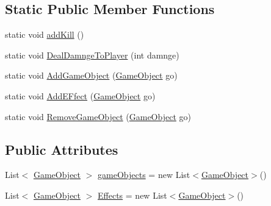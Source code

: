 \subsection*{Static Public Member Functions}
\begin{DoxyCompactItemize}
\item 
static void \mbox{\hyperlink{class_game2_1_1_game_world_acde506006de6e0361c5175597cb07df2}{add\+Kill}} ()
\item 
static void \mbox{\hyperlink{class_game2_1_1_game_world_a5ab430402255839068ec6c074a827f10}{Deal\+Damnge\+To\+Player}} (int damnge)
\item 
static void \mbox{\hyperlink{class_game2_1_1_game_world_a39e2b721c387b979bf3b71cae226607d}{Add\+Game\+Object}} (\mbox{\hyperlink{class_game2_1_1_game_object}{Game\+Object}} go)
\item 
static void \mbox{\hyperlink{class_game2_1_1_game_world_a65a39808ffc51f5dbda1e3af966af50e}{Add\+E\+Ffect}} (\mbox{\hyperlink{class_game2_1_1_game_object}{Game\+Object}} go)
\item 
static void \mbox{\hyperlink{class_game2_1_1_game_world_a00bb1f85c2b674fe4a6b06b6887859cc}{Remove\+Game\+Object}} (\mbox{\hyperlink{class_game2_1_1_game_object}{Game\+Object}} go)
\end{DoxyCompactItemize}
\subsection*{Public Attributes}
\begin{DoxyCompactItemize}
\item 
List$<$ \mbox{\hyperlink{class_game2_1_1_game_object}{Game\+Object}} $>$ \mbox{\hyperlink{class_game2_1_1_game_world_a8843df0d3c8de0ca7c7f37f9cebce878}{game\+Objects}} = new List$<$\mbox{\hyperlink{class_game2_1_1_game_object}{Game\+Object}}$>$()
\item 
List$<$ \mbox{\hyperlink{class_game2_1_1_game_object}{Game\+Object}} $>$ \mbox{\hyperlink{class_game2_1_1_game_world_a7c01e067c7488bd5a80b810c5183e3af}{Effects}} = new List$<$\mbox{\hyperlink{class_game2_1_1_game_object}{Game\+Object}}$>$()
\end{DoxyCompactItemize}
